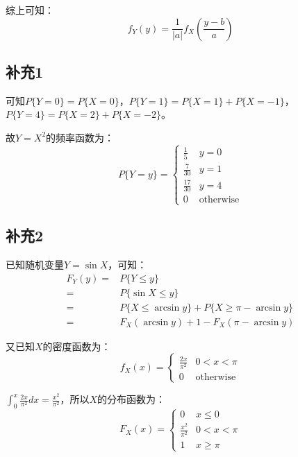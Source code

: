 \documentclass[a4paper,12pt]{ctexart}
\begin{document}
综上可知：
\begin{equation*}
	f_Y(y) = \frac{1}{|a|}f_X(\frac{y - b}{a})
\end{equation*}

\subsection*{补充1}

可知$P\{Y = 0\} = P\{X = 0\}$，$P\{Y = 1\} = P\{X = 1\} + P\{X = -1\}$，$P\{Y = 4\} = P\{X = 2\} + P\{X = -2\}$。

故$Y = X^2$的频率函数为：
\begin{equation*}
	P\{Y = y\} =
	\begin{cases}
		\frac{1}{5} & y = 0 \\
		\frac{7}{30} & y = 1 \\
		\frac{17}{30} & y = 4 \\
		0 & \text{otherwise}
	\end{cases}
\end{equation*}

\subsection*{补充2}

已知随机变量$Y = \sin X$，可知：
\begin{align*}
	F_Y(y) =& P\{Y \leq y\} \\
	=& P\{\sin X \leq y\} \\
	=& P\{X \leq \arcsin y\} + P\{X \geq \pi - \arcsin y\} \\
	=& F_X(\arcsin y) + 1 - F_X(\pi - \arcsin y)
\end{align*}

又已知$X$的密度函数为：
\begin{equation*}
	f_X(x) = 
	\begin{cases}
		\frac{2x}{\pi^2} & 0 < x < \pi \\
		0 & \text{otherwise}
	\end{cases}
\end{equation*}

$\int_{0}^{x} \frac{2x}{\pi^2} dx = \frac{x^2}{\pi^2}$，所以$X$的分布函数为：
\begin{equation*}
	F_X(x) = 
	\begin{cases}
		0 & x \leq 0 \\
		\frac{x^2}{\pi^2} & 0 < x < \pi \\
		1 & x \geq \pi
	\end{cases}
\end{equation*}
\end{document}
